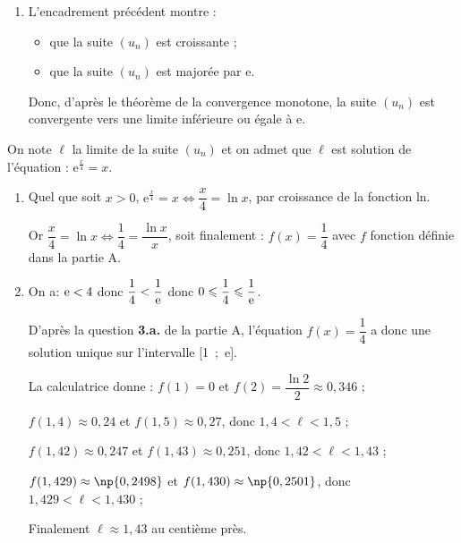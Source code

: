 \begin{enumerate}
\begin{list}{\textbullet}{}
L'encadrement est vrai au rang 0 et s'il est vrai au rang $n \in \N$, il est vrai au rang $n + 1$; d'après le principe de récurrence :
quel que soit $n \in \N$, \: $u_n \leqslant  u_{n+1} \leqslant \text{e}$.
\end{list}

\item %
L'encadrement précédent montre :

\begin{itemize}
\item que la suite $\left(u_n\right)$ est croissante ;
\item que la suite $\left(u_n\right)$ est majorée par $\text{e}$.
\end{itemize}

Donc, d'après le théorème de la convergence monotone,  la suite $\left(u_n\right)$ est convergente vers une limite inférieure ou égale à $\text{e}$.

\end{enumerate}

On note $\ell$ la limite de la suite $\left(u_n\right)$ et on admet que $\ell$ est solution de l'équation :
$\text{e}^{\frac{x}{4}} = x.$

\begin{enumerate}[resume]
\item %
Quel que soit $x > 0$, \:$\text{e}^{\frac{x}{4}} = x \iff \dfrac{x}{4} = \ln x$, par croissance de la fonction ln.

Or $\dfrac{x}{4} = \ln x \iff \dfrac14 = \dfrac{\ln x}{x}$, soit finalement :
$f(x) = \dfrac14$ avec $f$ fonction définie dans la partie A.

\item %

On a: $\text e <4$ donc $\dfrac{1}{4} < \dfrac{1}{\text e}$ donc $0\leqslant \dfrac{1}{4} \leqslant \dfrac{1}{\text e}$.

D'après la question \textbf{3.\:a.} de la partie A, l'équation $f(x) = \dfrac14$ a donc une solution unique sur l'intervalle [1~;~e].

La calculatrice donne : $f(1) = 0$ et $f(2) = \dfrac{\ln 2}{2} \approx 0,346$ ;

$f(1,4) \approx 0,24$ et $f(1,5) \approx 0,27$, donc $1,4 < \ell < 1,5$ ;

$f(1,42) \approx 0,247$ et $f(1,43) \approx 0,251$, donc $1,42 < \ell < 1,43$ ;

$f(1,429) \approx \np{0,2498}$ et $f(1,430) \approx \np{0,2501}$, donc $1,429 < \ell < 1,430$ ;

Finalement $\ell \approx 1,43$ au centième près.
\end{enumerate}

\bigskip


